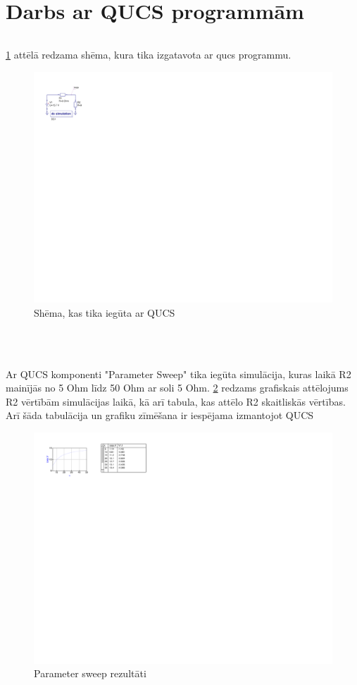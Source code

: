\documentclass{report}
\begin{document}
\section{Darbs ar QUCS programmām}
\begin{verbatim}
\end{verbatim}
\ref{att4} attēlā redzama shēma, kura tika izgatavota ar qucs programmu.
\begin{figure}[!b]
    \centering
    \includegraphics[scale=1.5, angle=270]{qucsscheme.pdf}
    \caption{Shēma, kas tika iegūta ar QUCS}
    \label{att4}
\end{figure}
\begin{verbatim}
    
    
\end{verbatim}
    
    Ar QUCS komponenti "Parameter Sweep" tika iegūta simulācija, kuras laikā R2 mainījās no 5 Ohm līdz 50 Ohm ar soli 5 Ohm. \ref{att5} redzams grafiskais attēlojums R2 vērtībām simulācijas laikā, kā arī tabula, kas attēlo R2 skaitliskās vērtības. Arī šāda tabulācija un grafiku zīmēšana ir iespējama izmantojot QUCS
    
\begin{figure}[!b]
    \centering
    \includegraphics[scale=1.5,angle=270]{qucssweep.pdf}
    \caption{Parameter sweep rezultāti}
    \label{att5}
\end{figure}

\printbibliography
\end{document}
